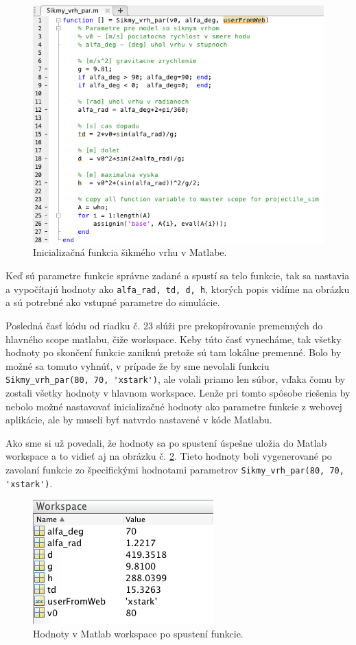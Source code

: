 \begin{figure}[H]
  \centering
  \includegraphics[scale=0.7]{img/code/matlab-function.png}
  \caption{Inicializačná funkcia šikmého vrhu v Matlabe.}
  \label{img-matlab-function}
\end{figure}

Keď sú parametre funkcie správne zadané a spustí sa telo funkcie, tak sa nastavia a vypočítajú hodnoty ako \verb|alfa_rad, td, d, h|, ktorých popis vidíme na obrázku a sú potrebné ako vstupné parametre do simulácie.

Posledná časť kódu od riadku č. 23 slúži pre prekopírovanie premenných do hlavného scope matlabu, čiže workspace. Keby túto časť vynecháme, tak všetky hodnoty po skončení funkcie zaniknú pretože sú tam lokálne premenné. Bolo by možné sa tomuto vyhnúť, v prípade že by sme nevolali funkciu \verb|Sikmy_vrh_par(80, 70, 'xstark')|, ale volali priamo len súbor, vďaka čomu by zostali všetky hodnoty v hlavnom workspace. Lenže pri tomto spôsobe riešenia by nebolo možné nastavovať inicializačné hodnoty ako parametre funkcie z webovej aplikácie, ale by museli byť natvrdo nastavené v kóde Matlabu.

Ako sme si už povedali, že hodnoty sa po spustení úspešne uložia do Matlab workspace a to vidieť aj na obrázku č. \ref{matlab-function-workspace}. Tieto hodnoty boli vygenerované po zavolaní funkcie zo špecifickými hodnotami parametrov \verb|Sikmy_vrh_par(80, 70, 'xstark')|.

\begin{figure}[H]
  \centering
  \includegraphics[scale=0.7]{img/code/matlab-function-workspace.png}
  \caption{Hodnoty v Matlab workspace po spustení funkcie.}
  \label{matlab-function-workspace}
\end{figure}

